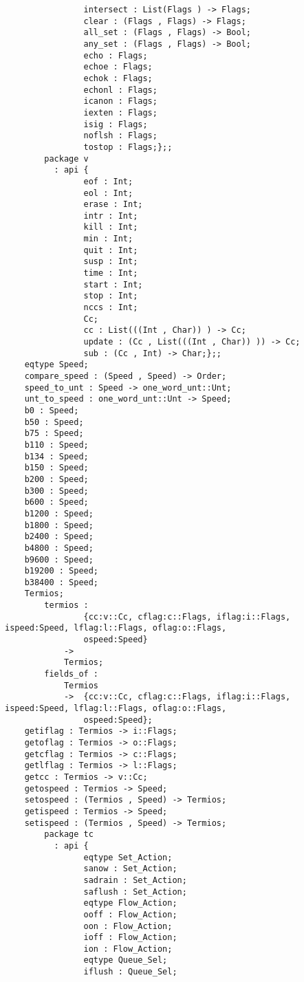 \begin{verbatim}
                intersect : List(Flags ) -> Flags;
                clear : (Flags , Flags) -> Flags;
                all_set : (Flags , Flags) -> Bool;
                any_set : (Flags , Flags) -> Bool;
                echo : Flags;
                echoe : Flags;
                echok : Flags;
                echonl : Flags;
                icanon : Flags;
                iexten : Flags;
                isig : Flags;
                noflsh : Flags;
                tostop : Flags;};;
        package v
          : api {
                eof : Int;
                eol : Int;
                erase : Int;
                intr : Int;
                kill : Int;
                min : Int;
                quit : Int;
                susp : Int;
                time : Int;
                start : Int;
                stop : Int;
                nccs : Int;
                Cc;
                cc : List(((Int , Char)) ) -> Cc;
                update : (Cc , List(((Int , Char)) )) -> Cc;
                sub : (Cc , Int) -> Char;};;
    eqtype Speed;
    compare_speed : (Speed , Speed) -> Order;
    speed_to_unt : Speed -> one_word_unt::Unt;
    unt_to_speed : one_word_unt::Unt -> Speed;
    b0 : Speed;
    b50 : Speed;
    b75 : Speed;
    b110 : Speed;
    b134 : Speed;
    b150 : Speed;
    b200 : Speed;
    b300 : Speed;
    b600 : Speed;
    b1200 : Speed;
    b1800 : Speed;
    b2400 : Speed;
    b4800 : Speed;
    b9600 : Speed;
    b19200 : Speed;
    b38400 : Speed;
    Termios;
        termios :
                {cc:v::Cc, cflag:c::Flags, iflag:i::Flags, ispeed:Speed, lflag:l::Flags, oflag:o::Flags,
                ospeed:Speed}
            ->
            Termios;
        fields_of :
            Termios
            ->  {cc:v::Cc, cflag:c::Flags, iflag:i::Flags, ispeed:Speed, lflag:l::Flags, oflag:o::Flags,
                ospeed:Speed};
    getiflag : Termios -> i::Flags;
    getoflag : Termios -> o::Flags;
    getcflag : Termios -> c::Flags;
    getlflag : Termios -> l::Flags;
    getcc : Termios -> v::Cc;
    getospeed : Termios -> Speed;
    setospeed : (Termios , Speed) -> Termios;
    getispeed : Termios -> Speed;
    setispeed : (Termios , Speed) -> Termios;
        package tc
          : api {
                eqtype Set_Action;
                sanow : Set_Action;
                sadrain : Set_Action;
                saflush : Set_Action;
                eqtype Flow_Action;
                ooff : Flow_Action;
                oon : Flow_Action;
                ioff : Flow_Action;
                ion : Flow_Action;
                eqtype Queue_Sel;
                iflush : Queue_Sel;

\end{verbatim}
